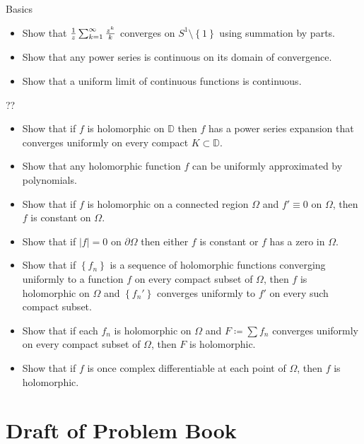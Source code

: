 Basics

\begin{itemize}
\tightlist
\item
  Show that \({1\over z} \sum_{k=1}^\infty {z^k \over k}\) converges on
  \(S^1 \setminus\left\{{1}\right\}\) using summation by parts.
\item
  Show that any power series is continuous on its domain of convergence.
\item
  Show that a uniform limit of continuous functions is continuous.
\end{itemize}

??

\begin{itemize}
\item
  Show that if \(f\) is holomorphic on \({\mathbb{D}}\) then \(f\) has a
  power series expansion that converges uniformly on every compact
  \(K\subset {\mathbb{D}}\).
\item
  Show that any holomorphic function \(f\) can be uniformly approximated
  by polynomials.
\item
  Show that if \(f\) is holomorphic on a connected region \(\Omega\) and
  \(f'\equiv 0\) on \(\Omega\), then \(f\) is constant on \(\Omega\).
\item
  Show that if \({\left\lvert {f} \right\rvert} = 0\) on
  \({{\partial}}\Omega\) then either \(f\) is constant or \(f\) has a
  zero in \(\Omega\).
\item
  Show that if \(\left\{{f_n}\right\}\) is a sequence of holomorphic
  functions converging uniformly to a function \(f\) on every compact
  subset of \(\Omega\), then \(f\) is holomorphic on \(\Omega\) and
  \(\left\{{f_n'}\right\}\) converges uniformly to \(f'\) on every such
  compact subset.
\item
  Show that if each \(f_n\) is holomorphic on \(\Omega\) and
  \(F \coloneqq\sum f_n\) converges uniformly on every compact subset of
  \(\Omega\), then \(F\) is holomorphic.
\item
  Show that if \(f\) is once complex differentiable at each point of
  \(\Omega\), then \(f\) is holomorphic.
\end{itemize}

\hypertarget{draft-of-problem-book}{%
\section{Draft of Problem Book}\label{draft-of-problem-book}}

